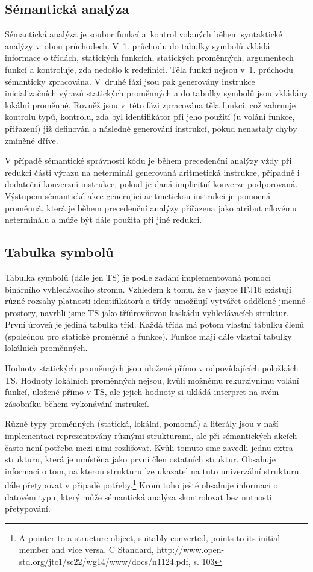 \documentclass[a4paper, 11pt]{article}
\begin{document}
    \subsection{Sémantická analýza}
    Sémantická analýza je soubor funkcí a kontrol volaných během syntaktické analýzy v obou průchodech. V 1. průchodu do tabulky symbolů vkládá informace o třídách, statických funkcích, statických pro\-měnných, argumentech funkcí a kontroluje, zda nedošlo k redefinici. Těla funkcí nejsou v 1. průchodu sémanticky zpracována. V druhé fázi jsou pak generovány instrukce inicializačních výrazů statických proměnných a do tabulky symbolů jsou vkládány lokální proměnné. Rovněž jsou v této fázi zpracována těla funkcí, což zahrnuje kontrolu typů, kontrolu, zda byl identifikátor při jeho použití (u volání funkce, přiřazení) již definován a následné generování instrukcí, pokud nenastaly chyby zmíněné dříve.\par
    V případě sémantické správnosti kódu je během precedenční analýzy vždy při redukci části výrazu na neterminál generovaná aritmetická instrukce, případně i dodateční konverzní instrukce, pokud je daná implicitní konverze podporovaná. Výstupem sémantické akce generující aritmetickou instrukci je pomocná proměnná, která je během precedenční analýzy přiřazena jako atribut cílovému neterminálu a může být dále použita při jiné redukci.\par
    \subsection{Tabulka symbolů}\label{ts}    
    Tabulka symbolů (dále jen TS) je podle zadání implementovaná pomocí binárního vyhledávacího stromu. Vzhledem k tomu, že v jazyce IFJ16 existují různé rozsahy platnosti identifikátorů a třídy umožňují vytvářet oddělené jmenné prostory, navrhli jsme TS jako tříúrovňovou kaskádu vyhledávacích struktur. První úroveň je jediná tabulka tříd. Každá třída má potom vlastní tabulku členů (společnou pro statické proměnné a funkce). Funkce mají dále vlastní tabulky lokálních proměnných. \par
    Hodnoty statických proměnných jsou uložené přímo v odpovídajících položkách TS. Hodnoty lokálních proměnných nejsou, kvůli možnému rekurzivnímu volání funkcí, uložené přímo v TS, ale jejich hodnoty si ukládá interpret na svém zásobníku během vykonávání instrukcí.\par
    Různé typy proměnných (statická, lokální, pomocná) a literály jsou v naší implementaci reprezentovány různými strukturami, ale při sémantických akcích často není potřeba mezi nimi rozlišovat. Kvůli tomuto sme zavedli jednu extra strukturu, která je umístěna jako první člen ostatních struktur. Obsahuje informaci o tom, na kterou strukturu lze ukazatel na tuto univerzální strukturu dále přetypovat v případě potřeby.\footnote{A pointer to a structure object, suitably converted, points to its initial member and vice versa. C Standard, http://www.open-std.org/jtc1/sc22/wg14/www/docs/n1124.pdf, s. 103} Krom toho ještě obsahuje informaci o datovém typu, který může sémantická analýza skontrolovat bez nutnosti přetypování.\par
\end{document}
